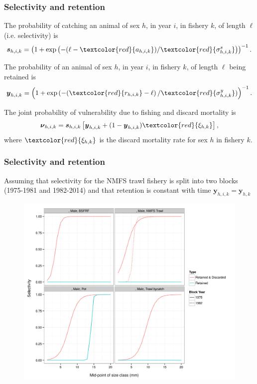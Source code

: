 \documentclass{beamer}
\begin{document}
\begin{frame}
\frametitle{Selectivity and retention}
The probability of catching an animal of sex $h$, in year $i$, in fishery $k$,
of length $\ell$ (i.e. selectivity) is
\begin{equation*}
  \boldsymbol{s}_{h,i,k} = \left(1 + \exp \left(-(\ell - \textcolor{red}{a_{h,i,k}}) /
  \textcolor{red}{\sigma_{h,i,k}^s} \right) \right)^{-1}.
\end{equation*}

The probability of an animal of sex $h$, in year $i$, in fishery $k$, of length
$\ell$ being retained is
\begin{equation*}
  \boldsymbol{y}_{h,i,k} = \left(1 + \exp \left(-(\textcolor{red}{r_{h,i,k}} - \ell \right) /
  \textcolor{red}{\sigma_{h,i,k}^y}) \right)^{-1}.
\end{equation*}

The joint probability of vulnerability due to fishing and discard mortality
is
\begin{equation*}
  \boldsymbol\nu_{h,i,k} = \boldsymbol{s}_{h,i,k} \left[ \boldsymbol{y}_{h,i,k} + (1 - \boldsymbol{y}_{h,i,k})
    \textcolor{red}{\xi_{h,k}} \right],
\end{equation*}
where $\textcolor{red}{\xi_{h,k}}$ is the discard mortality rate for sex $h$ in
fishery $k$.
\end{frame}


\begin{frame}
\frametitle{Selectivity and retention}
Assuming that selectivity for the NMFS trawl fishery is split into two blocks
(1975-1981 and 1982-2014) and that retention is constant with time
$\boldsymbol{y}_{h,i,k} = \boldsymbol{y}_{h,k}$
\begin{figure}[!htbp]
  \centering
  \includegraphics[width=0.6\linewidth]{../../examples/bbrkc/OneSex/figure/selectivity.png}
\end{figure}
\end{frame}
\end{document}
